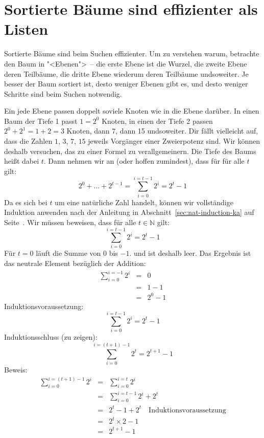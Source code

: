 
\section{Sortierte Bäume sind effizienter als Listen}
  
Sortierte Bäume sind beim Suchen effizienter. Um zu verstehen warum,
betrachte den Baum in "<Ebenen">~-- die erste Ebene ist die Wurzel,
die zweite Ebene deren Teilbäume, die dritte Ebene wiederum deren
Teilbäume undsoweiter.  Je besser der Baum sortiert ist, desto weniger
Ebenen gibt es, und desto weniger Schritte sind beim Suchen notwendig.

Ein
jede Ebene passen doppelt soviele Knoten wie in die Ebene darüber.
In einen Baum der Tiefe 1 passt $1 = 2^0$ Knoten, in einen
der Tiefe 2 passen $2^0 + 2^1 = 1+2 = 3$ Knoten, dann 7, dann 15
undsoweiter.  
Dir fällt vielleicht auf, dass die Zahlen $1$, $3$, $7$, $15$
jeweils Vorgänger einer Zweierpotenz sind.  Wir können deshalb
versuchen, das zu einer Formel zu verallgemeinern.  Die Tiefe des
Baums heißt dabei $t$.  Dann nehmen wir an (oder hoffen zumindest),
dass für für alle $t$ gilt:
%
\begin{displaymath}
  2^0 + ... + 2^{t-1} = \sum_{i=0}^{i=t-1} 2^i  = 2^t-1
\end{displaymath}
%
Da es sich bei $t$ um eine natürliche Zahl handelt, können wir
vollständige Induktion anwenden nach der Anleitung in
Abschnitt~\ref{sec:nat-induction-ka} auf
Seite~\pageref{sec:nat-induction-ka}.
Wir müssen beweisen, dass für alle $t\in\mathbb{N}$ gilt:
%
\begin{displaymath}
  \sum_{i=0}^{i=t-1} 2^i  = 2^t-1
\end{displaymath}
%
Für $t=0$ läuft die Summe von $0$ bis $-1$. und ist deshalb
leer.  Das Ergebnis ist das neutrale Element bezüglich der Addition:
%
\begin{eqnarray*}
  \sum_{i=0}^{i=-1} 2^i
  &=& 0\\
  &=& 1-1\\
  &=& 2^0 - 1
\end{eqnarray*}
%
\noindent Induktionsvoraussetzung:
\begin{displaymath}
  \sum_{i=0}^{i=t-1} 2^i  = 2^t-1
\end{displaymath}
%
Induktionsschluss (zu zeigen):
%
\begin{displaymath}
    \sum_{i=0}^{i=(t+1)-1} 2^t = 2^{t+1} - 1
\end{displaymath}
%
Beweis:
%
\begin{eqnarray*}
  \sum_{i=0}^{i=(t+1)-1} 2^i
  &=& \sum_{i=0}^{i=t} 2^i\\
  &=& \sum_{i=0}^{i=t-1} 2^i + 2^t\\
  &=& 2^t-1 + 2^t \quad\textrm{Induktionsvoraussetzung}\\
  &=& 2^t\times 2 - 1\\
  &=& 2^{t+1} - 1
\end{eqnarray*}
